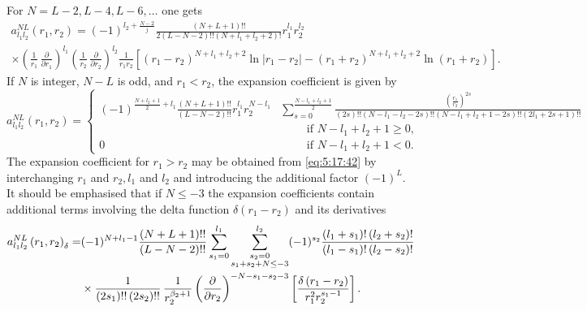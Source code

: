 For $N=L-2, L-4, L-6, \ldots$ one gets
\begin{multline}
a_{l_{1} l_{2}}^{N L}\left(r_{1}, r_{2}\right)=(-1)^{l_{2}+\frac{N-2}{j}} \frac{(N+L+1)!!}{2(L-N-2)!!\left(N+l_{1}+l_{2}+2\right)!} r_{1}^{l_{1}} r_{2}^{l_{2}}  \\
\times\left(\frac{1}{r_{1}} \, \frac{\partial}{\partial r_{1}}\right)^{l_{1}}\left(\frac{1}{r_{2}} \, \frac{\partial}{\partial r_{2}}\right)^{l_{2}} \frac{1}{r_{1} r_{2}}\left[\left(r_{1}-r_{2}\right)^{N+l_{1}+l_{2}+2} \ln \left|r_{1}-r_{2}\right|-\left(r_{1}+r_{2}\right)^{N+l_{1}+l_{2}+2} \ln \left(r_{1}+r_{2}\right)\right] . \label{eq:5:17:41}
\end{multline}
If $N$ is integer, $N-L$ is odd, and $r_{1}<r_{2}$, the expansion coefficient is given by
\begin{equation}
a_{l_{1} l_{2}}^{N L}\left(r_{1}, r_{2}\right)= 
\begin{cases}(-1)^{\frac{N+l_{2}+1}{2}+l_{1}} \frac{(N+L+1)!!}{(L-N-2) !!} r_{1}^{l_{1}} r_{2}^{N-l_{1}} &
  {\displaystyle\sum_{s=0}^{\frac{N-l_{1}+l_{2}+1}{2}}} \frac{\left(\frac{r_{1}}{r_{2}}\right)^{2 s}}{(2 s)!!\left(N-l_{1}-l_{2}-2 s\right)!!\left(N-l_{1}+l_{2}+1-2 s\right)!!
  \left(2 l_{1}+2 s+1\right)!!} \\  & \qquad\text { if } N-l_{1}+l_{2}+1 \geq 0, \\ 0& \qquad\text { if } N-l_{1}+l_{2}+1<0 .\end{cases}\label{eq:5:17:42}
\end{equation}
The expansion coefficient for $r_{1}>r_{2}$ may be obtained from \eqref{eq:5:17:42} by interchanging $r_{1}$ and $r_{2}, l_{1}$ and $l_{2}$ and introducing the additional factor $(-1)^{L}$. It should be emphasised that if $N \leq-3$ the expansion coefficients contain additional terms involving the delta function $\delta\left(r_{1}-r_{2}\right)$ and its derivatives \cite{ref078}
\begin{align}
a_{l_{1} l_{2}}^{N L}\left(r_{1}, r_{2}\right)_{\delta}= & (-1)^{N+l_{1}-1} \frac{(N+L+1)!!}{(L-N-2)!!} \sum_{s_{1}=0}^{l_{1}} \sum_{\substack{s_{2}=0 \\
s_{1}+s_{2}+N \leq-3}}^{l_{2}}(-1)^{s_{2}} \frac{\left(l_{1}+s_{1}\right)!\left(l_{2}+s_{2}\right)!}{\left(l_{1}-s_{1}\right)!\left(l_{2}-s_{2}\right)!}  \notag\\
& \times \frac{1}{\left(2 s_{1}\right)!!\left(2 s_{2}\right)!!} \, \frac{1}{r_{2}^{\beta_{2}+1}}\left(\frac{\partial}{\partial r_{2}}\right)^{-N-s_{1}-s_{2}-3}\left[\frac{\delta\left(r_{1}-r_{2}\right)}{r_{1}^{2} r_{2}^{s_{1}-1}}\right] . \label{eq:5:17:43}
\end{align}
